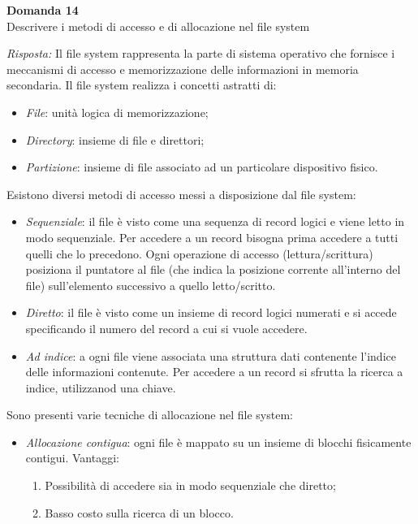 \documentclass{article}
\newenvironment{problem}[2][Domanda]
    { \begin{mdframed}[backgroundcolor=gray!20] \textbf{#1 #2} \\}
    {  \end{mdframed}}
\newenvironment{solution}
    {\textit{Risposta:}}
    {}
\begin{document}
\begin{problem}{14}
Descrivere i metodi di accesso e di allocazione nel file system
\end{problem}
\begin{solution}
Il file system rappresenta la parte di sistema operativo che fornisce i meccanismi di accesso e memorizzazione delle informazioni in memoria secondaria.
\newline
Il file system realizza i concetti astratti di:
\begin{itemize}
    \item \emph{File}: unità logica di memorizzazione;
    \item \emph{Directory}: insieme di file e direttori;
    \item \emph{Partizione}: insieme di file associato ad un particolare dispositivo fisico.
\end{itemize}
Esistono diversi metodi di accesso messi a disposizione dal file system:
\begin{itemize}
    \item \emph{Sequenziale}: il file è visto come una sequenza di record logici e viene letto in modo sequenziale. Per accedere a un record bisogna prima accedere a tutti quelli che lo precedono. Ogni operazione di accesso (lettura/scrittura) posiziona il puntatore al file (che indica la posizione corrente all’interno del file) sull’elemento successivo a quello letto/scritto. 
    \item \emph{Diretto}: il file è visto come un insieme di record logici numerati e si accede specificando il numero del record a cui si vuole accedere.
    \item \emph{Ad indice}: a ogni file viene associata una struttura dati contenente l’indice delle informazioni contenute. Per accedere a un record si sfrutta la ricerca a indice, utilizzanod una chiave. 
\end{itemize} 
Sono presenti varie tecniche di allocazione nel file system:
\begin{itemize}
    \item  \emph{Allocazione contigua}: ogni file è mappato su un insieme di blocchi fisicamente contigui.
    \newline
    \newline
    Vantaggi:
    \begin{enumerate}
        \item Possibilità di accedere sia in modo sequenziale che diretto;
        \item Basso costo sulla ricerca di un blocco.

\end{enumerate}
\end{itemize}
\end{solution}
\end{document}
